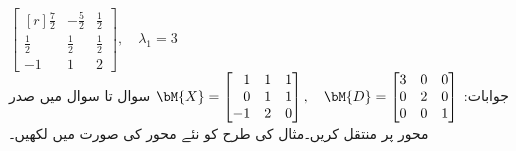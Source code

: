 $\begin{bmatrix*}[r] \tfrac{7}{2}&-\tfrac{5}{2}&\tfrac{1}{2}\\[0.25em] \tfrac{1}{2}&\tfrac{1}{2}&\tfrac{1}{2}\\[0.25em] -1&1&2 \end{bmatrix*},\quad \lambda_1=3$\\
جوابات:
$\bM{X}=\begin{bmatrix*}[r] 1&1&1\\0&1&1\\-1&2&0 \end{bmatrix*},\quad \bM{D}=\begin{bmatrix*}[r] 3&0&0\\0&2&0\\0&0&1 \end{bmatrix*}$
سوال  تا سوال  میں صدر محور پر منتقل کریں۔مثال   کی طرح  کو نئے محور  کی صورت میں لکھیں۔

